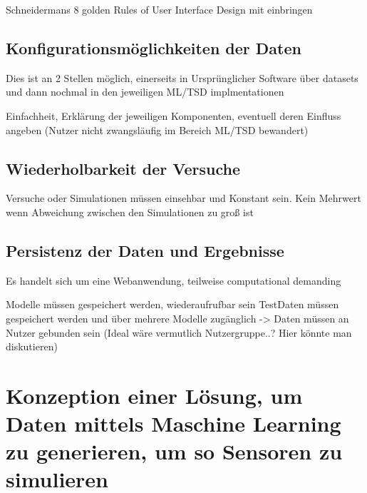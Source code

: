 Schneidermans 8 golden Rules of User Interface Design mit einbringen

\subsection{Konfigurationsmöglichkeiten der Daten}
Dies ist an 2 Stellen möglich, einerseits in Ursprünglicher Software über datasets und dann nochmal in den jeweiligen ML/TSD implmentationen

Einfachheit, Erklärung der jeweiligen Komponenten, eventuell deren Einfluss angeben (Nutzer nicht zwangsläufig im Bereich ML/TSD bewandert)


\subsection{Wiederholbarkeit der Versuche}
Versuche oder Simulationen müssen einsehbar und Konstant sein. Kein Mehrwert wenn Abweichung zwischen den Simulationen zu groß ist


\subsection{Persistenz der Daten und Ergebnisse}
Es handelt sich um eine Webanwendung, teilweise computational demanding 

Modelle müssen gespeichert werden, wiederaufrufbar sein
TestDaten müssen gespeichert werden und über mehrere Modelle zugänglich
-> Daten müssen an Nutzer gebunden sein (Ideal wäre vermutlich Nutzergruppe..? Hier könnte man diskutieren)



\section{Konzeption einer Lösung, um Daten mittels Maschine Learning zu generieren, um so Sensoren zu simulieren}
